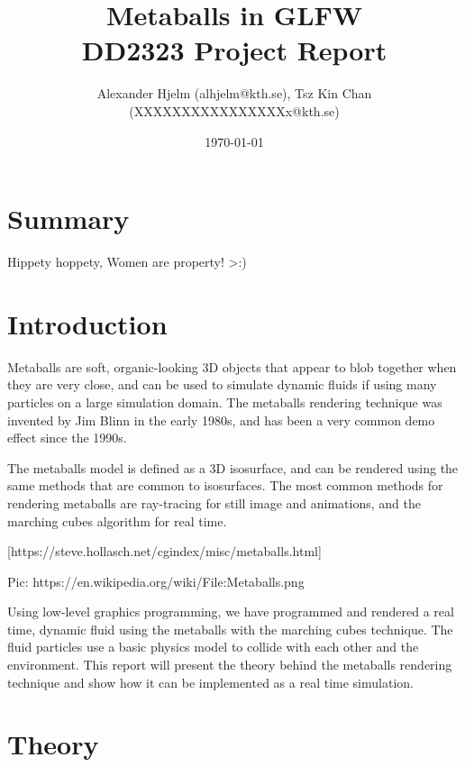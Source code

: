 \documentclass{article}
\begin{document}
    \title{%
      Metaballs in GLFW \\
      \large DD2323 Project Report \\}

    \author{Alexander Hjelm (alhjelm@kth.se), Tsz Kin Chan (XXXXXXXXXXXXXXXXx@kth.se)}

    \date{\today}

    \maketitle

    \section{Summary}
    Hippety hoppety, Women are property! >:)
    
    \section{Introduction}
    
    Metaballs are soft, organic-looking 3D objects that appear to blob together when they are very close, and can be used to simulate dynamic fluids if using many particles on a large simulation domain. 
    The metaballs rendering technique was invented by Jim Blinn in the early 1980s, and has been a very common demo effect since the 1990s.

    The metaballs model is defined as a 3D isosurface, and can be rendered using the same methods that are common to isosurfaces.
    The most common methods for rendering metaballs are ray-tracing for still image and animations, and the marching cubes algorithm for real time.

    [https://steve.hollasch.net/cgindex/misc/metaballs.html]

    Pic:
    https://en.wikipedia.org/wiki/File:Metaballs.png

    Using low-level graphics programming, we have programmed and rendered a real time, dynamic fluid using the metaballs with the marching cubes technique. The fluid particles use a basic physics model to collide with each other and the environment.
    This report will present the theory behind the metaballs rendering technique and show how it can be implemented as a real time simulation.

    \section{Theory}
\end{document}
